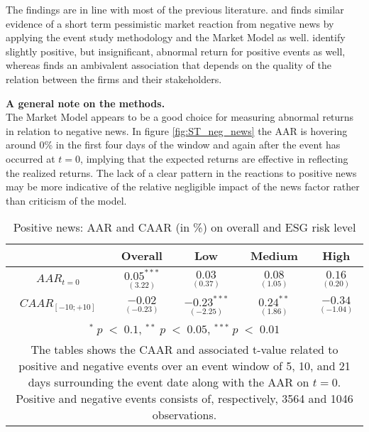 The findings are in line with most of the previous literature. \cite{Blancard_ESG_sentiment} and \citep{kruger2015corporate} finds similar evidence of a short term pessimistic market reaction from negative news by applying the event study methodology and the Market Model as well. \citeauthor{Blancard_ESG_sentiment} identify slightly positive, but insignificant, abnormal return for positive events as well, whereas \citeauthor{kruger2015corporate} finds an ambivalent association that depends on the quality of the relation between the firms and their stakeholders. 

\noindent \textbf{A general note on the methods.}\\
The Market Model appears to be a good choice for measuring abnormal returns in relation to negative news. In figure \ref{fig:ST_neg_news} the AAR is hovering around 0\% in the first four days of the window and again after the event has occurred at $t = 0$, implying that the expected returns are effective in reflecting the realized returns. The lack of a clear pattern in the reactions to positive news may be more indicative of the relative negligible impact of the news factor rather than criticism of the model.    

\begin{table}[H]
\centering
\caption{Positive news: AAR and CAAR (in \%) on overall and ESG risk level} 
\begin{tabular}{ccccc}
  \hline  \hline
  & \multicolumn{1}{c}{Overall} &  \multicolumn{1}{c}{Low} & \multicolumn{1}{c}{Medium} & \multicolumn{1}{c}{High}\\  
 \hline
$AAR_{t=0}$ &  $\underset{(3.22)}{0.05^{***}}$ & $\underset{(0.37)}{0.03}$ & $\underset{(1.05)}{0.08}$ &  $\underset{(0.20)}{0.16}$ \\ 
$CAAR_{[-10;+10]}$    & $\underset{(-0.23)}{-0.02}$ &  $\underset{(-2.25)}{-0.23^{***}}$ &  $\underset{(1.86)}{0.24^{**}}$ &  $\underset{(-1.04)}{-0.34}$ \\ 
    \hline \hline
   \multicolumn{5}{p{12.5cm}}{ \footnotesize $^* \; p\; <\; 0.1$, $ ^{**} \; p\; <\; 0.05$, $ ^{***} \; p\; <\; 0.01$  } \\
   \multicolumn{5}{p{13cm}}{\footnotesize The tables shows the CAAR and associated t-value related to positive and negative events over an event window of 5, 10, and 21 days surrounding the event date along with the AAR on $t=0$. Positive and negative events consists of, respectively, 3564 and 1046 observations. } \\
   \hline
\end{tabular}
\label{tab: ST_pos_significance}
\end{table}

